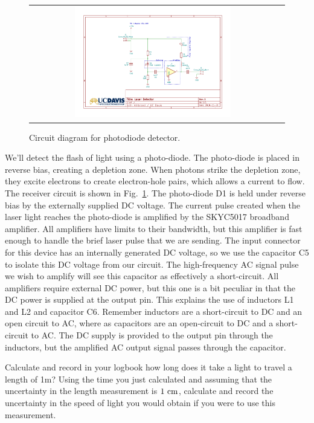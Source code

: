 \begin{figure}[htbp]
\begin{center}
\begin{tabular}{cc}
\includegraphics[width=0.65\textwidth]{figs/labs/c_air/cair_detector}
\end{tabular}
\end{center}
\caption{\label{fig:cdetectorcirc} Circuit diagram for photodiode detector.}
\end{figure}

We'll detect the flash of light using a photo-diode.  The photo-diode
is placed in reverse bias, creating a depletion zone.  When photons
strike the depletion zone, they excite electrons to create
electron-hole pairs, which allows a current to flow.  The receiver
circuit is shown in Fig.~\ref{fig:cdetectorcirc}.  The photo-diode D1
is held under reverse bias by the externally supplied DC voltage.  The
current pulse created when the laser light reaches the photo-diode is
amplified by the SKYC5017 broadband amplifier.  All amplifiers have
limits to their bandwidth, but this amplifier is fast enough to handle
the brief laser pulse that we are sending.  The input connector for
this device has an internally generated DC voltage, so we use the
capacitor C5 to isolate this DC voltage from our circuit.  The
high-frequency AC signal pulse we wish to amplify will see this
capacitor as effectively a short-circuit.  All amplifiers require
external DC power, but this one is a bit peculiar in that the DC power
is supplied at the output pin.  This explains the use of inductors L1
and L2 and capacitor C6.  Remember inductors are a short-circuit to DC
and an open circuit to AC, where as capacitors are an open-circuit to
DC and a short-circuit to AC.  The DC supply is provided to the output
pin through the inductors, but the amplified AC output signal passes
through the capacitor.


\begin{calculation}  Calculate and record in your logbook how long does it take a light to travel a length of 1m? Using the
time you just calculated and assuming that the uncertainty in the length measurement is $1~\rm cm$, calculate and record the uncertainty in the
speed of light you would obtain if you were to use this measurement.
\end{calculation}

